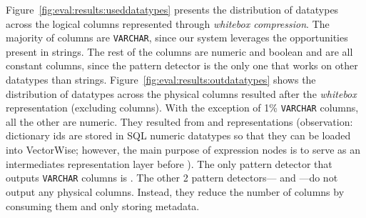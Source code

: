 Figure~\ref{fig:eval:results:useddatatypes} presents the distribution of datatypes across the logical columns represented through \textit{whitebox compression}. The majority of columns are \verb|VARCHAR|, since our system leverages the opportunities present in strings. The rest of the columns are numeric and boolean and are all constant columns, since the  pattern detector is the only one that works on other datatypes than strings. Figure~\ref{fig:eval:results:outdatatypes} shows the distribution of datatypes across the physical columns resulted after the \textit{whitebox} representation (excluding columns). With the exception of 1\% \verb|VARCHAR| columns, all the other are numeric. They resulted from  and  representations (observation: dictionary ids are stored in SQL numeric datatypes so that they can be loaded into VectorWise; however, the main purpose of  expression nodes is to serve as an intermediates representation layer before ). The only pattern detector that outputs \verb|VARCHAR| columns is . The other 2 pattern detectors--- and ---do not output any physical columns. Instead, they reduce the number of columns by consuming them and only storing metadata.

